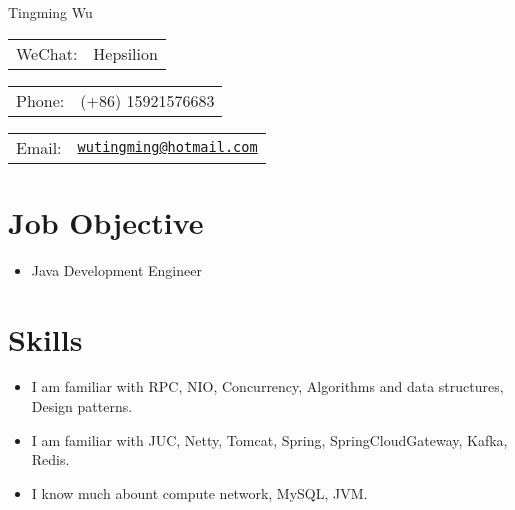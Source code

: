 \documentclass[letterpaper, UTF8]{article}
\def\name{Tingming Wu}
\begin{document}
	
	{\huge \name}
	
	
	\vspace{0.15in}  %
	
	\begin{minipage}{0.33\linewidth}
		\begin{tabular}{ll}
			WeChat: & Hepsilion \\
		\end{tabular}
	\end{minipage}
	\begin{minipage}{0.33\linewidth}
		\begin{tabular}{ll}
			Phone: & (+86) 15921576683 \\
		\end{tabular}
	\end{minipage}
	\begin{minipage}{0.33\linewidth}
		\begin{tabular}{ll}
			Email: & \href{mailto:wutingming@hotmail.com}{\tt wutingming@hotmail.com} \\
		\end{tabular}
	\end{minipage}
	\vspace{-0.1in}
	
	\section*{\textbf{Job Objective}}\vspace{-0.05in}
	\begin{itemize}
		\item Java Development Engineer
	\end{itemize}
	\vspace{-0.25in}
	
	\section*{\textbf{Skills}}\vspace{-0.05in}
	\begin{itemize}
		\item I am familiar with RPC, NIO, Concurrency, Algorithms and data structures, Design patterns.
		\item I am familiar with JUC, Netty, Tomcat, Spring, SpringCloudGateway, Kafka, Redis.
		\item I know much abount compute network, MySQL, JVM.
	\end{itemize}
	\vspace{-0.32in}
	
\end{document}

